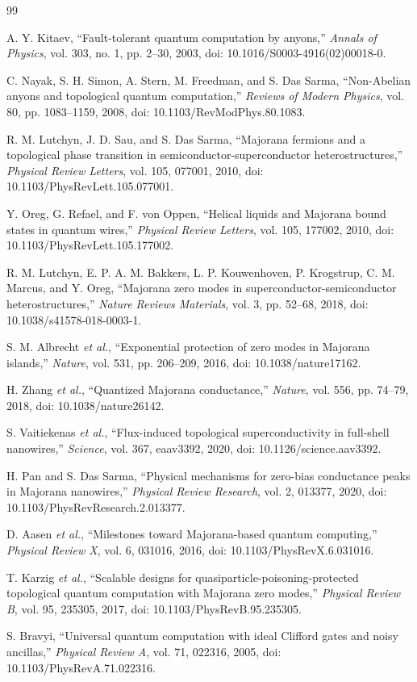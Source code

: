 \documentclass[conference]{IEEEtran}
\begin{document}
\begin{thebibliography}{99}

A. Y. Kitaev, ``Fault-tolerant quantum computation by anyons,'' \emph{Annals of Physics}, vol. 303, no. 1, pp. 2--30, 2003, doi: 10.1016/S0003-4916(02)00018-0.

C. Nayak, S. H. Simon, A. Stern, M. Freedman, and S. Das Sarma, ``Non-Abelian anyons and topological quantum computation,'' \emph{Reviews of Modern Physics}, vol. 80, pp. 1083--1159, 2008, doi: 10.1103/RevModPhys.80.1083.

R. M. Lutchyn, J. D. Sau, and S. Das Sarma, ``Majorana fermions and a topological phase transition in semiconductor-superconductor heterostructures,'' \emph{Physical Review Letters}, vol. 105, 077001, 2010, doi: 10.1103/PhysRevLett.105.077001.

Y. Oreg, G. Refael, and F. von Oppen, ``Helical liquids and Majorana bound states in quantum wires,'' \emph{Physical Review Letters}, vol. 105, 177002, 2010, doi: 10.1103/PhysRevLett.105.177002.

R. M. Lutchyn, E. P. A. M. Bakkers, L. P. Kouwenhoven, P. Krogstrup, C. M. Marcus, and Y. Oreg, ``Majorana zero modes in superconductor-semiconductor heterostructures,'' \emph{Nature Reviews Materials}, vol. 3, pp. 52--68, 2018, doi: 10.1038/s41578-018-0003-1.

S. M. Albrecht \emph{et al.}, ``Exponential protection of zero modes in Majorana islands,'' \emph{Nature}, vol. 531, pp. 206--209, 2016, doi: 10.1038/nature17162.

H. Zhang \emph{et al.}, ``Quantized Majorana conductance,'' \emph{Nature}, vol. 556, pp. 74--79, 2018, doi: 10.1038/nature26142.

S. Vaitiekenas \emph{et al.}, ``Flux-induced topological superconductivity in full-shell nanowires,'' \emph{Science}, vol. 367, eaav3392, 2020, doi: 10.1126/science.aav3392.

H. Pan and S. Das Sarma, ``Physical mechanisms for zero-bias conductance peaks in Majorana nanowires,'' \emph{Physical Review Research}, vol. 2, 013377, 2020, doi: 10.1103/PhysRevResearch.2.013377.

D. Aasen \emph{et al.}, ``Milestones toward Majorana-based quantum computing,'' \emph{Physical Review X}, vol. 6, 031016, 2016, doi: 10.1103/PhysRevX.6.031016.

T. Karzig \emph{et al.}, ``Scalable designs for quasiparticle-poisoning-protected topological quantum computation with Majorana zero modes,'' \emph{Physical Review B}, vol. 95, 235305, 2017, doi: 10.1103/PhysRevB.95.235305.

S. Bravyi, ``Universal quantum computation with ideal Clifford gates and noisy ancillas,'' \emph{Physical Review A}, vol. 71, 022316, 2005, doi: 10.1103/PhysRevA.71.022316.

\end{thebibliography}
\end{document}
